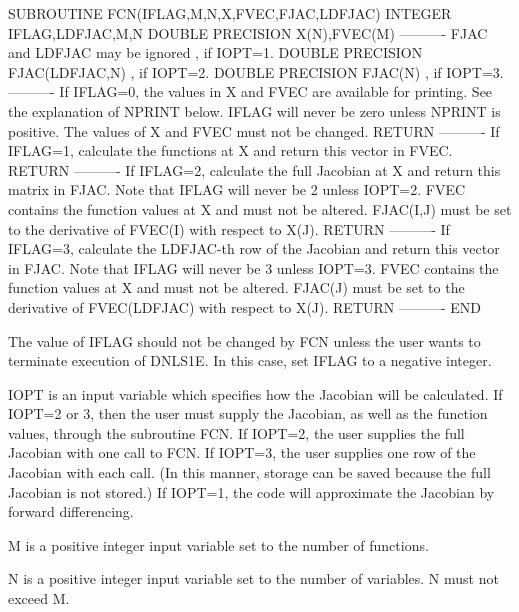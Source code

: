\documentclass[11pt,twoside,nolof]{starlink}
\begin{document}
\begin{terminalv}
         SUBROUTINE FCN(IFLAG,M,N,X,FVEC,FJAC,LDFJAC)
         INTEGER IFLAG,LDFJAC,M,N
         DOUBLE PRECISION X(N),FVEC(M)
         ----------
         FJAC and LDFJAC may be ignored       , if IOPT=1.
         DOUBLE PRECISION FJAC(LDFJAC,N)      , if IOPT=2.
         DOUBLE PRECISION FJAC(N)             , if IOPT=3.
         ----------
           If IFLAG=0, the values in X and FVEC are available
           for printing.  See the explanation of NPRINT below.
           IFLAG will never be zero unless NPRINT is positive.
           The values of X and FVEC must not be changed.
         RETURN
         ----------
           If IFLAG=1, calculate the functions at X and return
           this vector in FVEC.
         RETURN
         ----------
           If IFLAG=2, calculate the full Jacobian at X and return
           this matrix in FJAC.  Note that IFLAG will never be 2 unless
           IOPT=2.  FVEC contains the function values at X and must
           not be altered.  FJAC(I,J) must be set to the derivative
           of FVEC(I) with respect to X(J).
         RETURN
         ----------
           If IFLAG=3, calculate the LDFJAC-th row of the Jacobian
           and return this vector in FJAC.  Note that IFLAG will
           never be 3 unless IOPT=3.  FVEC contains the function
           values at X and must not be altered.  FJAC(J) must be
           set to the derivative of FVEC(LDFJAC) with respect to X(J).
         RETURN
         ----------
         END


         The value of IFLAG should not be changed by FCN unless the
         user wants to terminate execution of DNLS1E.  In this case,
         set IFLAG to a negative integer.


       IOPT is an input variable which specifies how the Jacobian will
         be calculated.  If IOPT=2 or 3, then the user must supply the
         Jacobian, as well as the function values, through the
         subroutine FCN.  If IOPT=2, the user supplies the full
         Jacobian with one call to FCN.  If IOPT=3, the user supplies
         one row of the Jacobian with each call.  (In this manner,
         storage can be saved because the full Jacobian is not stored.)
         If IOPT=1, the code will approximate the Jacobian by forward
         differencing.

       M is a positive integer input variable set to the number of
         functions.

       N is a positive integer input variable set to the number of
         variables.  N must not exceed M.


\end{terminalv}
\end{document}
